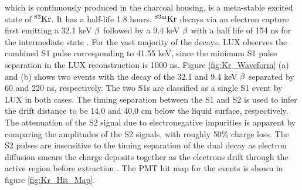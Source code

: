\noindent \KrCal which is continuously produced in the charcoal housing, is a meta-stable excited state of $\rm^{83}Kr$. It has a half-life 1.8 hours. $\rm^{83m}Kr$ decays via an electron capture first emitting a 32.1 keV $\rm \beta$ followed by a 9.4 keV $\rm \beta$ with a half life of 154 ns for the intermediate state \cite{Start_Kr} \cite{Kastens}.  For the vast majority of the decays, LUX observes the combined S1 pulse corresponding to 41.55 keV, since the minimum S1 pulse separation in the LUX reconstruction is 1000 ns. Figure \ref{fig:Kr_Waveform} (a) and (b) shows two \KrCal events with the decay of the 32.1 and 9.4 keV $\rm \beta$ separated by 60 and 220 ns, respectively. The two S1s are classified as a single S1 event by LUX in both cases. The timing separation between the S1 and S2 is used to infer the drift distance to be 14.0 and 40.0 cm below the liquid surface, respectively. The attenuation of the S2 signal due to electronegative impurities is apparent by comparing the amplitudes of the S2 signals, with roughly 50\% charge loss. The S2 pulses are insensitive to the timing separation of the dual decay as electron diffusion smears the charge deposits together as the electrons drift through the active region before extraction \cite{Electron_Diffusion}. The PMT hit map for the events is shown in figure \ref{fig:Kr_Hit_Map}.



